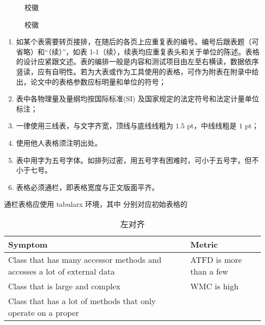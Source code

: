 \begin{texcodeonly}[]{}
  \begin{figure}[H]
    \subfigg    \subfigg
    \subfigg    \subfigg
    \subfigg    \subfigg
    \caption{校徽}
  \end{figure}
\end{texcodeonly}

\begin{figure}[h]
  \subfigg    \subfigg
  \subfigg    \subfigg
  \subfigg    \subfigg
  \caption{校徽}
\end{figure}

\clearpage


\begin{tcolorbox}[colback=red!5!white,colframe=red!75!black]
  \begin{enumerate}[leftmargin=0.5cm]
    \item 如某个表需要转页接排，在随后的各页上应重复表的编号。编号后跟表题（可省略）和“（续）”，如表 1-1（续），续表均应重复表头和关于单位的陈述。表格的设计应紧跟文述。表的编排一般是内容和测试项目由左至右横读，数据依序竖读，应有自明性。若为大表或作为工具使用的表格，可作为附表在附录中给出，论文中的表格参数应标明量和单位的符号；
    \item 表中各物理量及量纲均按国际标准(SI) 及国家规定的法定符号和法定计量单位标注；
    \item 一律使用三线表，与文字齐宽，顶线与底线线粗为 $1.5$ pt，中线线粗是 $1$ pt；
    \item 使用他人表格须注明出处。
    \item 表中用字为五号字体。如排列过密，用五号字有困难时，可小于五号字，但不小于七号。
    \item 表格必须通栏，即表格宽度与正文版面平齐。
  \end{enumerate}
\end{tcolorbox}




通栏表格应使用 tabularx 环境，其中  分别对应初始表格的 

\begin{texcode}[]{}
  \begin{table}[H]
    \caption{左对齐}
    \begin{tabularx}{\textwidth}{XX}
    \toprule
        \textbf{Symptom} & \textbf{Metric} \\
    \midrule
        Class that has many accessor methods and accesses a lot of external data & ATFD is more than a few\\
        Class that is large and complex & WMC is high \\
        Class that has a lot of methods that only operate on a proper & \\
    \bottomrule
    \end{tabularx}
  \end{table}
\end{texcode}

